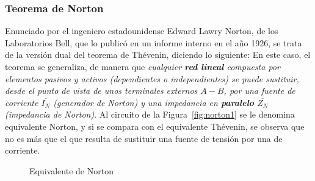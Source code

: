      
\subsubsection{Teorema de Norton}
Enunciado por el ingeniero estadounidense Edward Lawry Norton, de los
Laboratorios Bell, que lo publicó en un informe interno en el año
1926, se trata de la versión dual del teorema de Thévenin, diciendo lo
siguiente: En este caso, el teorema se generaliza, de manera que
\textit{cualquier \textbf{red lineal} compuesta por elementos pasivos
  y activos (dependientes o independientes) se puede sustituir, desde
  el punto de vista de unos terminales externos $A-B$, por una fuente
  de corriente $\overline{I_{N}}$ (generador de Norton) y una
  impedancia en \textbf{paralelo} $\overline{Z_{N}}$ (impedancia de
  Norton)}. Al circuito de la Figura~\ref{fig:norton1} se le denomina
equivalente Norton, y si se compara con el equivalente Thévenin, se
observa que no es más que el que resulta de sustituir una fuente de
tensión por una de corriente.
\begin{figure}[H]
  \centering {}\hfil
  \caption{Equivalente de Norton}
\end{figure}

